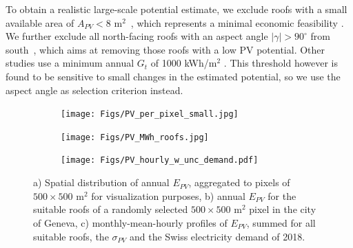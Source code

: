 To obtain a realistic large-scale potential estimate, we exclude roofs with a small available area of $A_{PV}<8$ m$^2$~\cite{assouline_large-scale_2018}, which represents a minimal economic feasibility \cite{assouline_quantifying_2017, assouline_large-scale_2018, portmann_sonnendach.ch:_2016, romero_rodriguez_assessment_2017}. 
We further exclude all north-facing roofs with an aspect angle $|\gamma| > 90^\circ$ from south~\cite{assouline_large-scale_2018, assouline_quantifying_2017}, which aims at removing those roofs with a low PV potential. Other studies use a minimum annual $G_t$ of 1000 kWh/m$^2$ \cite{buffat_scalable_2018, portmann_sonnendach.ch:_2016, romero_rodriguez_assessment_2017}. This threshold however is found to be sensitive to small changes in the estimated potential, so we use the aspect angle as selection criterion instead.

\begin{figure}[b]
\centering
\begin{subfigure}{.63\textwidth}
  \centering
  \texttt{[image: Figs/PV\_per\_pixel\_small.jpg]}
  \subcaption{}
\end{subfigure}
\begin{subfigure}{.34\textwidth}
  \centering
  \texttt{[image: Figs/PV\_MWh\_roofs.jpg]}
  \subcaption{}
\end{subfigure}
\begin{subfigure}{.95\textwidth}
  \centering
  \texttt{[image: Figs/PV\_hourly\_w\_unc\_demand.pdf]} 
  \subcaption{}
\end{subfigure}
\caption{a) Spatial distribution of annual $E_{PV}$, aggregated to pixels of $500 \times 500$ m$^2$ for visualization purposes, 
b) annual $E_{PV}$ for the suitable roofs of a randomly selected $500 \times 500$ m$^2$ pixel in the city of Geneva,
c) monthly-mean-hourly profiles of $E_{PV}$, summed for all suitable roofs, the $\sigma_{PV}$ and the Swiss electricity demand of 2018.}
\label{fig:results}
\end{figure}

